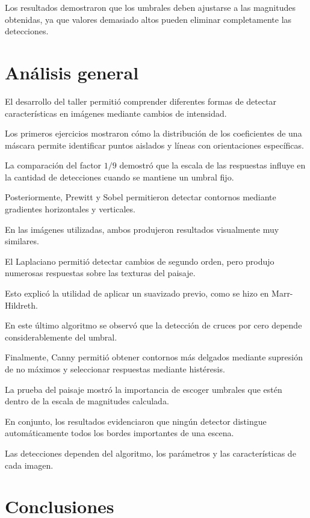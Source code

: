 \documentclass[11pt,letterpaper]{article}
\begin{document}
Los resultados demostraron que los
umbrales deben ajustarse a las
magnitudes obtenidas, ya que valores
demasiado altos pueden eliminar
completamente las detecciones.

\section{Análisis general}

El desarrollo del taller permitió
comprender diferentes formas de
detectar características en imágenes
mediante cambios de intensidad.

Los primeros ejercicios mostraron
cómo la distribución de los coeficientes
de una máscara permite identificar
puntos aislados y líneas con
orientaciones específicas.

La comparación del factor $1/9$
demostró que la escala de las respuestas
influye en la cantidad de detecciones
cuando se mantiene un umbral fijo.

Posteriormente, Prewitt y Sobel
permitieron detectar contornos
mediante gradientes horizontales
y verticales.

En las imágenes utilizadas,
ambos produjeron resultados
visualmente muy similares.

El Laplaciano permitió detectar
cambios de segundo orden,
pero produjo numerosas respuestas
sobre las texturas del paisaje.

Esto explicó la utilidad de aplicar
un suavizado previo, como se hizo
en Marr-Hildreth.

En este último algoritmo se observó
que la detección de cruces por cero
depende considerablemente del umbral.

Finalmente, Canny permitió obtener
contornos más delgados mediante
supresión de no máximos y seleccionar
respuestas mediante histéresis.

La prueba del paisaje mostró
la importancia de escoger umbrales
que estén dentro de la escala
de magnitudes calculada.

En conjunto, los resultados evidenciaron
que ningún detector distingue
automáticamente todos los bordes
importantes de una escena.

Las detecciones dependen del algoritmo,
los parámetros y las características
de cada imagen.

\section{Conclusiones}
\end{document}
